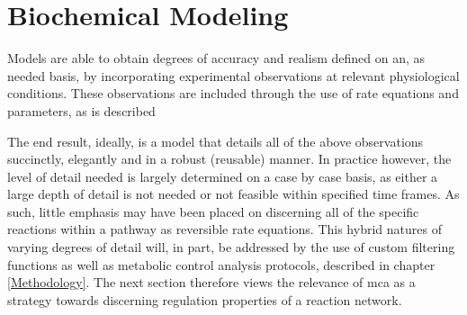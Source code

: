 \section{Biochemical Modeling}
Models are able to obtain degrees of accuracy and realism defined on an, as needed basis, by incorporating experimental observations at relevant physiological conditions. These observations are included through the use of rate equations and parameters, as is described 

The end result, ideally, is a model that details all of the above observations succinctly, elegantly and in a robust (reusable) manner. In practice however, the level of detail needed is largely determined on a case by case basis, as either a large depth of detail is not needed or not feasible within specified time frames. As such, little emphasis may have been placed on discerning all of the specific reactions within a pathway as reversible rate equations. This hybrid natures of varying degrees of detail will, in part, be addressed by the use of custom filtering functions as well as metabolic control analysis protocols, described in chapter \ref{Methodology}. The next section therefore views the relevance of \gls{mca} as a strategy towards discerning regulation properties of a reaction network.
